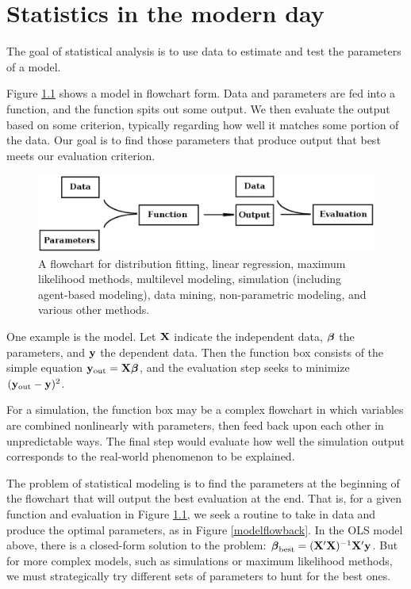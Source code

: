 \chapter[Introduction]{Statistics in the modern day}\label{intro}



The goal of statistical analysis is to use data to estimate and test
the parameters of a model.

Figure \ref{modelflow} shows a model in flowchart form.  Data and
parameters are fed into a function, and the function spits out some
output. We then evaluate the output based on some criterion, typically
regarding how well it matches some portion of the data. Our
goal is to find those parameters that produce output that best meets
our evaluation criterion.


\begin{figure}[htb]
\begin{center}
\includegraphics[width=\textwidth*\real{1.05}]{models}
\end{center}
\caption{A flowchart for distribution fitting, linear regression,
maximum likelihood methods, multilevel modeling,
simulation (including agent-based modeling), data mining, non-parametric modeling,
and various other methods.}
\label{modelflow}
\end{figure}

One example is the  model. Let ${\bf X}$
indicate the independent data, ${\mbox{\boldmath$\beta$}}$ the parameters, and ${\bf y}$ the
dependent data. Then the function box consists of the simple equation
${\bf y}_{\rm out} = {\bf X}{\mbox{\boldmath$\beta$}}$, and the evaluation step seeks to minimize
$({\bf y}_{\rm out} - {\bf y})^2$. 

For a simulation, the function box may be a complex flowchart in which
variables are combined nonlinearly with parameters, then feed back upon
each other in unpredictable ways. The final step
would evaluate how well the simulation output corresponds to the
real-world phenomenon to be explained.

The problem of statistical modeling is to find the parameters at the
beginning of the flowchart that will output the best evaluation at the
end. That is, for a given function and evaluation in Figure
\ref{modelflow}, we seek a routine to take in data and produce the optimal parameters, as in Figure \ref{modelflowback}.
In the OLS model above, there is a closed-form solution to the problem:
${\mbox{\boldmath$\beta$}}_{\rm best}=({\bf X}'{\bf X})^{-1}{\bf X}'{\bf y}$.  But for more complex models,
such as simulations or maximum likelihood methods, we must strategically
try different sets of parameters to hunt for the best ones.

